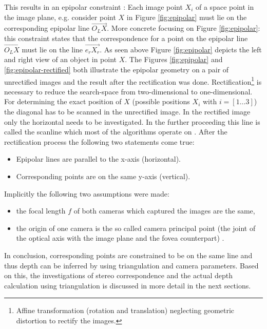 \noindent This results in an epipolar constraint \citep{cyganek2011introduction}:
Each image point $X_i$ of a space point in the image plane, e.g. consider point $X$ in Figure \ref{fig:epipolar} must lie on the corresponding epipolar line $\vec{O_LX}$.
More concrete focusing on Figure \ref{fig:epipolar}: this constraint states that the correspondence for a point on the epipolar line $\vec{O_LX}$ must lie on the line $\vec{e_rX_r}$.
As seen above Figure \ref{fig:epipolar} depicts the left and right view of an object in point $X$.
\newline\newline\noindent The Figures \ref{fig:epipolar} and \ref{fig:epipolar-rectified} both illustrate the epipolar geometry on a pair of unrectified images and the result after the rectification was done.
Rectification\footnote{Affine transformation (rotation and translation) neglecting geometric distortion to rectify the images.} is necessary to reduce the search-space from two-dimensional to one-dimensional.
For determining the exact position of $X$ (possible positions $X_i$ with $i = [1 \dots 3]$) the diagonal has to be scanned in the unrectified image.
In the rectified image only the horizontal needs to be investigated.
In the further proceeding this line is called the scanline which most of the algorithms operate on \citep{cyganek2011introduction, chowdhury2009new}.
After the rectification process the following two statements come true:

\begin{itemize}
  \item Epipolar lines are parallel to the x-axis (horizontal).
  \item Corresponding points are on the same y-axis (vertical).
\end{itemize}

\noindent Implicitly the following two assumptions were made:

\begin{itemize}
  \item the focal length $f$ of both cameras which captured the images are the same,
  \item the origin of one camera is the so called camera principal point (the joint of the optical axis with the image plane and the fovea counterpart) \citep{cyganek2011introduction}.
\end{itemize}

\noindent In conclusion, corresponding points are constrained to be on the same line and thus depth can be inferred by using triangulation and camera parameters.
Based on this, the investigations of stereo correspondence and the actual depth calculation using triangulation is discussed in more detail in the next sections.

